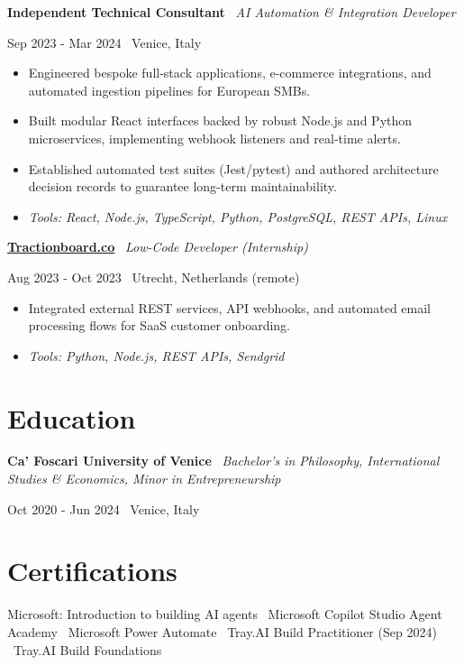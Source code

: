 \documentclass[a4paper,10pt]{article}
\newcommand{\role}[4]{%
  \vspace{2pt}\noindent
  \begin{minipage}[t]{0.70\textwidth}\raggedright\textbf{#1} \textbullet\ \textit{#3}\end{minipage}%
  \hfill
  \begin{minipage}[t]{0.28\textwidth}\raggedleft\footnotesize\color{gray}#2 \textbullet\ #4\end{minipage}%
  \vspace{1pt}%
}
\begin{document}
\role{Independent Technical Consultant}{Sep 2023 - Mar 2024}{AI Automation \& Integration Developer}{Venice, Italy}
\begin{itemize}
  \item Engineered bespoke full-stack applications, e-commerce integrations, and automated ingestion pipelines for European SMBs.
  \item Built modular React interfaces backed by robust Node.js and Python microservices, implementing webhook listeners and real-time alerts.
  \item Established automated test suites (Jest/pytest) and authored architecture decision records to guarantee long-term maintainability.
  \item \textit{Tools: React, Node.js, TypeScript, Python, PostgreSQL, REST APIs, Linux}
\end{itemize}

\role{\href{https://tractionboard.co}{Tractionboard.co}}{Aug 2023 - Oct 2023}{Low-Code Developer (Internship)}{Utrecht, Netherlands (remote)}
\begin{itemize}
  \item Integrated external REST services, API webhooks, and automated email processing flows for SaaS customer onboarding.
  \item \textit{Tools: Python, Node.js, REST APIs, Sendgrid}
\end{itemize}

\section{Education}
\role{Ca' Foscari University of Venice}{Oct 2020 - Jun 2024}{Bachelor's in Philosophy, International Studies \& Economics, Minor in Entrepreneurship}{Venice, Italy}

\section{Certifications}
Microsoft: Introduction to building AI agents \textbullet\ Microsoft Copilot Studio Agent Academy \textbullet\ Microsoft Power Automate \textbullet\ Tray.AI Build Practitioner (Sep 2024) \textbullet\ Tray.AI Build Foundations

\end{document}
